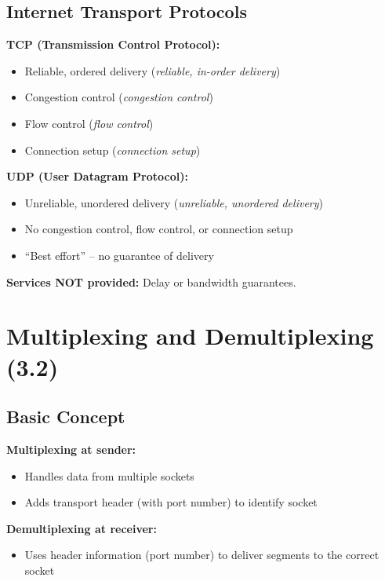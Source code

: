 \subsection{Internet Transport Protocols}

\begin{keybox}
\textbf{TCP (Transmission Control Protocol):}
\begin{itemize}[noitemsep]
    \item Reliable, ordered delivery (\emph{reliable, in-order delivery})
    \item Congestion control (\emph{congestion control})
    \item Flow control (\emph{flow control})
    \item Connection setup (\emph{connection setup})
\end{itemize}

\textbf{UDP (User Datagram Protocol):}
\begin{itemize}[noitemsep]
    \item Unreliable, unordered delivery (\emph{unreliable, unordered delivery})
    \item No congestion control, flow control, or connection setup
    \item ``Best effort'' -- no guarantee of delivery
\end{itemize}

\textbf{Services NOT provided:} Delay or bandwidth guarantees.
\end{keybox}

\section{Multiplexing and Demultiplexing (3.2)}

\subsection{Basic Concept}

\begin{keybox}
\textbf{Multiplexing at sender:}
\begin{itemize}[noitemsep]
    \item Handles data from multiple sockets
    \item Adds transport header (with port number) to identify socket
\end{itemize}

\textbf{Demultiplexing at receiver:}
\begin{itemize}[noitemsep]
    \item Uses header information (port number) to deliver segments to the correct socket
\end{itemize}
\end{keybox}

